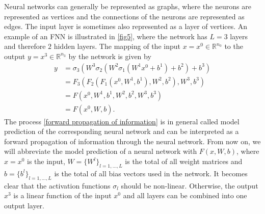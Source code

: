 Neural networks can generally be represented as graphs, where the neurons are represented as vertices and the connections of the neurons are represented as edges. The input layer is sometimes also represented as a layer of vertices. An example of an FNN is illustrated in \cref{fig5}, where the network has $L=3$ layers and therefore $2$ hidden layers. The mapping of the input $x = x^0 \in \mathbb{R}^{n_0}$ to the output $y = x^3 \in \mathbb{R}^{n_3}$ by the network is given by 
\begin{equation}
    \label{forward propagation of information}
    \begin{aligned}
        y &=\sigma_{3} \left( W^{3} \sigma_{2} \left(  W^{2} \sigma_{1} \left( W^{1} x^{0}+b^{1}\right)+b^{2}\right)+b^{3}\right) \\
        &=F_{3}\left(F_{2}\left(F_{1}\left(x^{0}, W^{1}, b^{1}\right), W^{2}, b^{2}\right), W^{3}, b^{3}\right) \\
        &= F \left( x^{0}, W^{1}, b^{1}, W^{2}, b^{2}, W^{3}, b^{3} \right) \\
        & = F(x^{0}, W, b).
    \end{aligned}
\end{equation}
The process \cref{forward propagation of information} is in general called model prediction of the corresponding neural network and can be interpreted as a forward propagation of information through the neural network. From now on, we will abbreviate the model prediction of a neural network with $F(x, W, b)$, where $x = x^0$ is the input, $W = \{ W^l \}_{l = 1, \ldots, L}$ is the total of all weight matrices and $b = \{ b^l \}_{l = 1, \ldots, L}$ is the total of all bias vectors used in the network. It becomes clear that the activation functions $\sigma_l$ should be non-linear. Otherwise, the output $x^3$ is a linear function of the input $x^0$ and all layers can be combined into one output layer. \\

